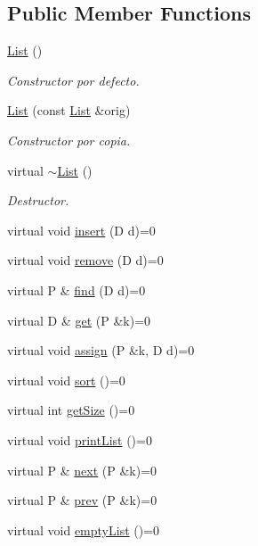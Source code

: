 \subsection*{Public Member Functions}
\begin{DoxyCompactItemize}
\item 
\hyperlink{classList_a3deb54ab4f51c6c39aa4015f258b5812}{List} ()
\begin{DoxyCompactList}\small\item\em Constructor por defecto. \end{DoxyCompactList}\item 
\hyperlink{classList_af8bcd7dae1bc30af2158075482c3d8d9}{List} (const \hyperlink{classList}{List} \&orig)
\begin{DoxyCompactList}\small\item\em Constructor por copia. \end{DoxyCompactList}\item 
virtual \hyperlink{classList_a624593fb77847bf7ad4cacfba3442471}{$\sim$\+List} ()
\begin{DoxyCompactList}\small\item\em Destructor. \end{DoxyCompactList}\item 
virtual void \hyperlink{classList_a01f588d87d47f8332928eca38f7b11bb}{insert} (D d)=0
\item 
virtual void \hyperlink{classList_a14fc4e853102018df78db3899aa00d71}{remove} (D d)=0
\item 
virtual P \& \hyperlink{classList_ae117dbe387f64f548fd0bddcc4d536dc}{find} (D d)=0
\item 
virtual D \& \hyperlink{classList_afb5a777f30a186adce69028c387bf413}{get} (P \&k)=0
\item 
virtual void \hyperlink{classList_a413440e7e102c944bec31ad5dce30b27}{assign} (P \&k, D d)=0
\item 
virtual void \hyperlink{classList_ae3795939f27cf3e688cd470450e0c27a}{sort} ()=0
\item 
virtual int \hyperlink{classList_af213bbcf13ee436a0f04cde66e337672}{get\+Size} ()=0
\item 
virtual void \hyperlink{classList_a8b34931e187e7e6b86aad86510ce4f3b}{print\+List} ()=0
\item 
virtual P \& \hyperlink{classList_afa9ca2c678bc4f7d15ab0f4ab7c45421}{next} (P \&k)=0
\item 
virtual P \& \hyperlink{classList_a6c44364a04dff392b76e6a286074f3a1}{prev} (P \&k)=0
\item 
virtual void \hyperlink{classList_a24b4f177a70215980e81ef7b2981fa1e}{empty\+List} ()=0
\end{DoxyCompactItemize}
